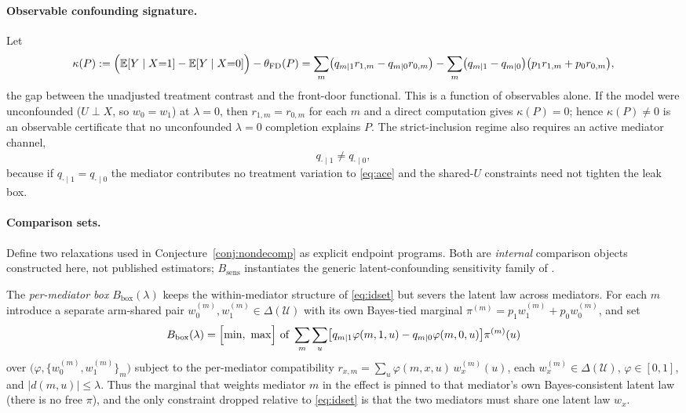 \documentclass[11pt]{article}
\newcommand{\E}{\mathbb{E}}
\theoremstyle{definition}
\theoremstyle{plain}
\theoremstyle{remark}
\begin{document}
\paragraph{Observable confounding signature.} Let
\begin{equation}\label{eq:kappa}
  \kappa(P):=\Bigl(\E[Y\mid X{=}1]-\E[Y\mid X{=}0]\Bigr)-\theta_{\mathrm{FD}}(P)
  =\sum_m\bigl(q_{m\mid1}r_{1,m}-q_{m\mid0}r_{0,m}\bigr)-\sum_m\bigl(q_{m\mid1}-q_{m\mid0}\bigr)\bigl(p_1 r_{1,m}+p_0 r_{0,m}\bigr),
\end{equation}
the gap between the unadjusted treatment contrast and the front-door functional. This is a function of
observables alone. If the model were unconfounded ($U\perp X$, so $w_0=w_1$) at $\lambda=0$, then
$r_{1,m}=r_{0,m}$ for each $m$ and a direct computation gives $\kappa(P)=0$; hence $\kappa(P)\neq0$ is an
observable certificate that no unconfounded $\lambda=0$ completion explains $P$. The strict-inclusion
regime also requires an active mediator channel,
\begin{equation}\label{eq:active-mediator}
  q_{\cdot\mid1}\neq q_{\cdot\mid0},
\end{equation}
because if $q_{\cdot\mid1}=q_{\cdot\mid0}$ the mediator contributes no treatment variation to
\eqref{eq:ace} and the shared-$U$ constraints need not tighten the leak box.

\paragraph{Comparison sets.} Define two relaxations used in Conjecture~\ref{conj:nondecomp} as explicit
endpoint programs. Both are \emph{internal} comparison objects constructed here, not published estimators;
$B_{\mathrm{sens}}$ instantiates the generic latent-confounding sensitivity family of
\citet{FrauenMelnychukFeuerriegel2023SharpBounds}.

The \emph{per-mediator box} $B_{\mathrm{box}}(\lambda)$ keeps the within-mediator structure of
\eqref{eq:idset} but severs the latent law across mediators. For each $m$ introduce a separate arm-shared
pair $w_0^{(m)},w_1^{(m)}\in\Delta(\mathcal U)$ with its own Bayes-tied marginal
$\pi^{(m)}=p_1 w_1^{(m)}+p_0 w_0^{(m)}$, and set
\[
  B_{\mathrm{box}}(\lambda)=\Bigl[\min,\ \max\Bigr]\ \text{of}\
  \sum_{m}\sum_{u}\bigl[q_{m\mid1}\varphi(m,1,u)-q_{m\mid0}\varphi(m,0,u)\bigr]\pi^{(m)}(u)
\]
over $\bigl(\varphi,\{w_0^{(m)},w_1^{(m)}\}_m\bigr)$ subject to the per-mediator compatibility
$r_{x,m}=\sum_u\varphi(m,x,u)\,w_x^{(m)}(u)$, each $w_x^{(m)}\in\Delta(\mathcal U)$, $\varphi\in[0,1]$, and
$|d(m,u)|\le\lambda$. Thus the marginal that weights mediator $m$ in the effect is pinned to that mediator's
own Bayes-consistent latent law (there is no free $\pi$), and the only constraint dropped relative to
\eqref{eq:idset} is that the two mediators must share one latent law $w_x$.
\end{document}
